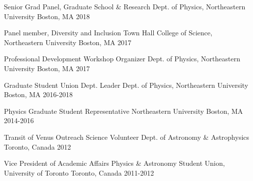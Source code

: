 \begin{cvhonors}

\cvhonor
	{Senior Grad Panel, Graduate School \& Research} %
	{Dept. of Physics, Northeastern University} %
	{Boston, MA} %
	{2018} %
    


  \cvhonor
    {Panel member, Diversity and Inclusion Town Hall} %
    {College of Science, Northeastern University} %
    {Boston, MA} %
    {2017} %
    
  \cvhonor
    {Professional Development Workshop Organizer} %
    {Dept. of Physics, Northeastern University} %
    {Boston, MA} %
    {2017} %

  \cvhonor
    {Graduate Student Union Dept. Leader} %
    {Dept. of Physics, Northeastern University} %
    {Boston, MA} %
    {2016-2018} %
     
  \cvhonor
    {Physics Graduate Student Representative} %
    {Northeastern University} %
    {Boston, MA} %
    {2014-2016} %
    
    
  \cvhonor
    {Transit of Venus Outreach Science Volunteer} %
    {Dept. of Astronomy \& Astrophysics} %
    {Toronto, Canada} %
    {2012} %
    
  \cvhonor
    {Vice President of Academic Affairs} %
    {Physics \& Astronomy Student Union, University of Toronto} %
    {Toronto, Canada} %
    {2011-2012} %

\end{cvhonors}
